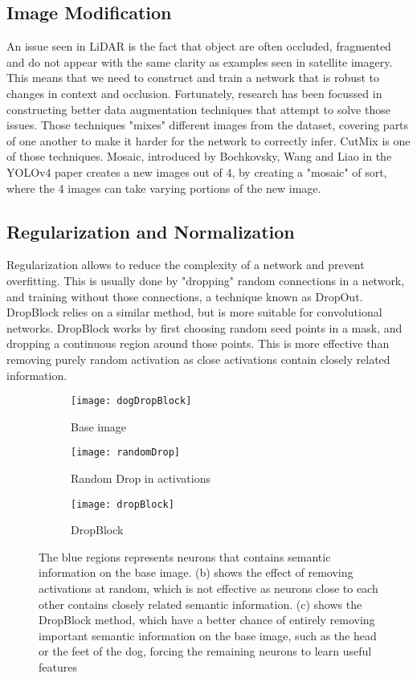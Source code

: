 \subsection{Image Modification}
An issue seen in LiDAR is the fact that object are often occluded, fragmented and do not appear with the same clarity as examples seen in satellite imagery. This means that we need to construct and train a network that is robust to changes in context and occlusion. Fortunately, research has been focussed in constructing better data augmentation techniques that attempt to solve those issues. Those techniques "mixes" different images from the dataset, covering parts of one another to make it harder for the network to correctly infer. CutMix\cite{cutMix} is one of those techniques. Mosaic, introduced by Bochkovsky, Wang and Liao in the YOLOv4 paper\cite{yolov4} creates a new images out of 4, by creating a "mosaic" of sort, where the 4 images can take varying portions of the new image. 


\subsection{Regularization and Normalization}
Regularization allows to reduce the complexity of a network and prevent overfitting. This is usually done by "dropping" random connections in a network, and training without those connections, a technique known as DropOut\cite{dropOut}. DropBlock\cite{dropBlock} relies on a similar method, but is more suitable for convolutional networks. DropBlock works by first choosing random seed points in a mask, and dropping a continuous region around those points. This is more effective than removing purely random activation as close activations contain closely related information.

\begin{figure}[H]
	\begin{subfigure}[t]{.3\textwidth}
  \centering
  \texttt{[image: dogDropBlock]}
  \caption{Base image}
  \label{fig:dropBlockA}
\end{subfigure}
	\begin{subfigure}[t]{.3\textwidth}
  \centering
  \texttt{[image: randomDrop]}  
  \caption{Random Drop in activations}
  \label{fig:dropBlockB}
\end{subfigure}
	\begin{subfigure}[t]{.3\textwidth}
  \centering
  \texttt{[image: dropBlock]}  
  \caption{DropBlock}
  \label{fig:dropBlockC}
\end{subfigure}
\caption{The blue regions represents neurons that contains semantic information on the base image. (b) shows the effect of removing activations at random, which is not effective as neurons close to each other contains closely related semantic information. (c) shows the DropBlock method, which have a better chance of entirely removing important semantic information on the base image, such as the head or the feet of the dog, forcing the remaining neurons to learn useful features}
\label{fig:dropBlock}
\end{figure}

